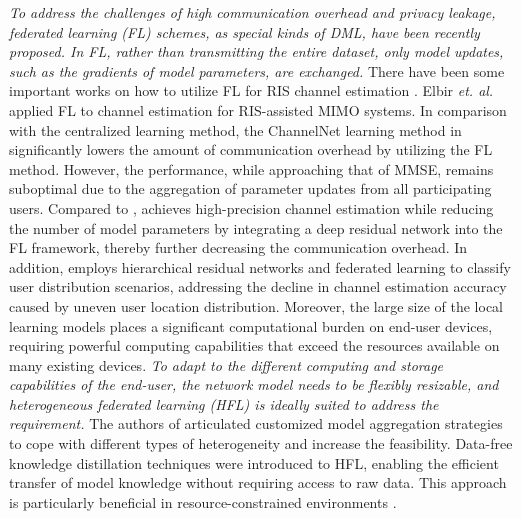 \emph{To address the challenges of high communication overhead and privacy leakage, federated learning (FL) schemes, as special kinds of DML, have been recently proposed. In FL, rather than transmitting the entire dataset, only model updates, such as the gradients of model parameters, are exchanged.} There have been some important works on how to utilize FL for RIS channel estimation \cite{FL_Elbir, FL_Shen_Qin}. Elbir \textit{et. al.} applied FL to channel estimation for RIS-assisted MIMO systems\cite{FL_Elbir}. In comparison with  the centralized learning method, the ChannelNet learning method in \cite{FL_Elbir} significantly lowers the  amount of communication overhead by utilizing the FL method. However, the performance, while approaching that of MMSE, remains suboptimal due to the aggregation of parameter updates from all participating users. Compared to \cite{FL_Elbir}, \cite{FL_Shen_Qin} achieves high-precision channel estimation while reducing the number of model parameters by integrating a deep residual network into the FL framework, thereby further decreasing the communication overhead. 
In addition, \cite{FL_Bin} employs hierarchical residual networks and federated learning to classify user distribution scenarios, addressing the decline in channel estimation accuracy caused by uneven user location distribution.
Moreover, the large size of the local learning models places a significant computational burden on end-user devices, requiring powerful computing capabilities that exceed the resources available on many existing devices. \emph{To adapt to the different computing and storage capabilities of the end-user, the network model needs to be flexibly resizable, and heterogeneous federated learning (HFL) is ideally suited to address the requirement.} The authors of \cite{HFL1} articulated customized model aggregation strategies to cope with different types of heterogeneity and  increase the feasibility. Data-free knowledge distillation techniques were introduced to HFL, enabling the efficient transfer of model knowledge without requiring access to raw data. This approach is particularly beneficial in resource-constrained environments  \cite{HFL2}.

